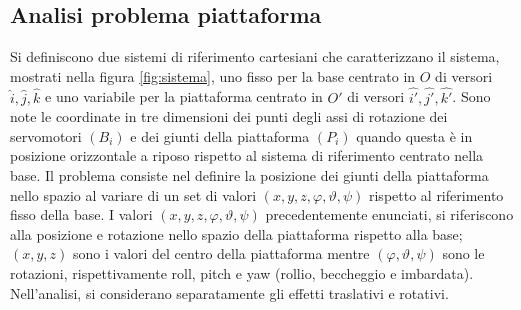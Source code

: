 \documentclass[12pt,twoside,openright]{article}
\begin{document}
\subsection{Analisi problema piattaforma}\label{platform}

Si definiscono due sistemi di riferimento cartesiani che caratterizzano il sistema, mostrati nella figura \ref{fig:sistema}, uno fisso per la base centrato in $O$ di versori $\hat{i},\hat{j},\hat{k}$ e uno variabile per la piattaforma centrato in $O'$ di versori $\hat{i'},\hat{j'},\hat{k'}$. Sono note le coordinate in tre dimensioni dei punti degli assi di rotazione dei servomotori $({B_i})$ e dei giunti della piattaforma $(P_i)$ quando questa è in posizione orizzontale a riposo rispetto al sistema di riferimento centrato nella base. Il problema consiste nel definire la posizione dei giunti della piattaforma nello spazio al variare di un set di valori $(x,y,z,\varphi,\vartheta,\psi)$ rispetto al riferimento fisso della base. I valori $(x,y,z,\varphi,\vartheta,\psi)$ precedentemente enunciati, si riferiscono alla posizione e rotazione nello spazio della piattaforma rispetto alla base; $(x,y,z)$ sono i valori del centro della piattaforma mentre $(\varphi,\vartheta,\psi)$ sono le rotazioni, rispettivamente roll, pitch e yaw (rollio, beccheggio e imbardata). Nell'analisi, si considerano separatamente gli effetti traslativi e rotativi.
\end{document}
